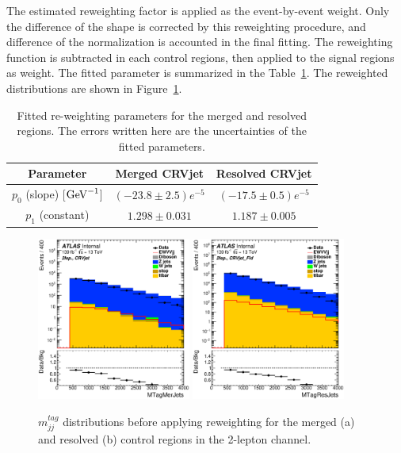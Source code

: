 The estimated reweighting factor is applied as the event-by-event weight. 
Only the difference of the shape is corrected by this reweighting procedure, and difference of the normalization is accounted in the final fitting.
The reweighting function is subtracted in each control regions, then applied to the signal regions as weight.
The fitted parameter is summarized in the Table~\ref{tab:fit}. 
The reweighted distributions are shown in Figure~\ref{fig:2lep_mtag_before_rw}.

\begin{table}[htbp]
 \footnotesize
\begin{center}
\begin{tabular}{ | c | c | c |}
\hline
Parameter & Merged CRVjet & Resolved CRVjet  \\
\hline
$p_{0}$ (slope) [$\mathrm{GeV}^{-1}$] & $(-23.8 \pm 2.5)e^{-5}$ &  $(-17.5 \pm 0.5)e^{-5}$ \\
 \hline
$p_{1}$ (constant)  & $1.298 \pm 0.031$ & $1.187 \pm 0.005$ \\
\hline
\end{tabular}
\caption{\label{tab:fit} Fitted re-weighting parameters for the merged and resolved regions. The errors written here are the uncertainties of the fitted parameters. }
  \end{center}
\end{table}


\begin{figure}[ht]
    \centering
    \includegraphics[width=0.45\textwidth]{figures/2lep/reweighting/before_reweighting/C_0ptag1pfat0pjet_0ptv_CRVjet_MTagMerJets_Log.eps}
    \includegraphics[width=0.45\textwidth]{figures/2lep/reweighting/before_reweighting/C_0ptag2pjet_0ptv_CRVjet_Fid_MTagResJets_Log.eps}
    \caption{ $m^{tag}_{jj}$ distributions before applying reweighting for the merged (a) and resolved (b) control regions in the 2-lepton channel.}
    \label{fig:2lep_mtag_before_rw}
\end{figure}

